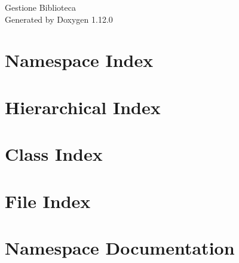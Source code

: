 \documentclass[twoside]{book}
\newcommand{\+}{\discretionary{\mbox{\scriptsize$\hookleftarrow$}}{}{}}
\newcommand{\clearemptydoublepage}{%
    \newpage{\pagestyle{empty}\cleardoublepage}%
  }
\begin{document}
  \raggedbottom
    \hypersetup{pageanchor=false,
                bookmarksnumbered=true,
                pdfencoding=unicode
               }
  \begin{titlepage}
  \vspace*{7cm}
  \begin{center}%
  {\Large Gestione Biblioteca}\\
  \vspace*{1cm}
  {\large Generated by Doxygen 1.12.0}\\
  \end{center}
  \end{titlepage}
  \clearemptydoublepage
  \tableofcontents
  \clearemptydoublepage
  \hypersetup{pageanchor=true}
\chapter{Namespace Index}

\chapter{Hierarchical Index}

\chapter{Class Index}

\chapter{File Index}

\chapter{Namespace Documentation}




\end{document}

